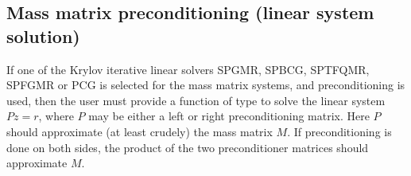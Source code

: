 \documentclass[letterpaper,10pt,english]{sphinxmanual}
\begin{document}
\subsection{Mass matrix preconditioning (linear system solution)}
\label{c_interface/User_supplied:cinterface-massprecsolvefn}\label{c_interface/User_supplied:mass-matrix-preconditioning-linear-system-solution}
If one of the Krylov iterative linear solvers SPGMR, SPBCG, SPTFQMR,
SPFGMR or PCG is selected for the mass matrix systems, and
preconditioning is used, then the user must provide a function of type
{\hyperref[c_interface/User_supplied:c.ARKSpilsMassPrecSolveFn]{\emph{}}} to solve the linear system
\(Pz=r\), where \(P\) may be either a left or right
preconditioning matrix.  Here \(P\) should approximate (at least
crudely) the mass matrix \(M\).  If preconditioning is done on
both sides, the product of the two preconditioner matrices should
approximate \(M\).
\end{document}
